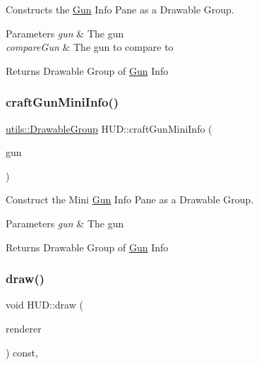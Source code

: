 Constructs the \mbox{\hyperlink{class_gun}{Gun}} Info Pane as a Drawable Group. 


\begin{DoxyParams}{Parameters}
{\em gun} & The gun \\
\hline
{\em compare\+Gun} & The gun to compare to\\
\hline
\end{DoxyParams}
\begin{DoxyReturn}{Returns}
Drawable Group of \mbox{\hyperlink{class_gun}{Gun}} Info 
\end{DoxyReturn}
\mbox{\label{class_h_u_d_afb3619fbbcf5d463c87a33623d140b6a}} 
\subsubsection{\texorpdfstring{craftGunMiniInfo()}{craftGunMiniInfo()}}
{\footnotesize\ttfamily \mbox{\hyperlink{structutils_1_1_drawable_group}{utils\+::\+Drawable\+Group}} H\+U\+D\+::craft\+Gun\+Mini\+Info (\begin{DoxyParamCaption}\item[{\mbox{\hyperlink{class_gun}{Gun}} $\ast$}]{gun }\end{DoxyParamCaption})\hspace{0.3cm}{\ttfamily [static]}}



Construct the Mini \mbox{\hyperlink{class_gun}{Gun}} Info Pane as a Drawable Group. 


\begin{DoxyParams}{Parameters}
{\em gun} & The gun\\
\hline
\end{DoxyParams}
\begin{DoxyReturn}{Returns}
Drawable Group of \mbox{\hyperlink{class_gun}{Gun}} Info 
\end{DoxyReturn}
\mbox{\label{class_h_u_d_a9e27d1929b86f3cf30144aaf602e427d}} 
\subsubsection{\texorpdfstring{draw()}{draw()}}
{\footnotesize\ttfamily void H\+U\+D\+::draw (\begin{DoxyParamCaption}\item[{\mbox{\hyperlink{classsf_1_1_render_target}{sf\+::\+Render\+Target}} \&}]{renderer }\end{DoxyParamCaption}) const\hspace{0.3cm}{\ttfamily [override]}, {\ttfamily [virtual]}}



